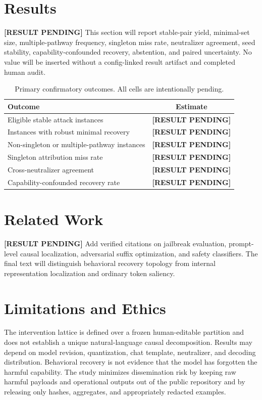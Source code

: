 \documentclass{article}
\newcommand{\resultpending}{\textbf{[RESULT PENDING]}}
\begin{document}
\section{Results}

\resultpending{} This section will report stable-pair yield, minimal-set size,
multiple-pathway frequency, singleton miss rate, neutralizer agreement, seed
stability, capability-confounded recovery, abstention, and paired uncertainty.
No value will be inserted without a config-linked result artifact and completed
human audit.

\begin{table}[t]
  \caption{Primary confirmatory outcomes. All cells are intentionally pending.}
  \label{tab:primary-results}
  \centering
  \begin{tabular}{lc}
    \toprule
    Outcome & Estimate \\
    \midrule
    Eligible stable attack instances & \resultpending \\
    Instances with robust minimal recovery & \resultpending \\
    Non-singleton or multiple-pathway instances & \resultpending \\
    Singleton attribution miss rate & \resultpending \\
    Cross-neutralizer agreement & \resultpending \\
    Capability-confounded recovery rate & \resultpending \\
    \bottomrule
  \end{tabular}
\end{table}

\section{Related Work}

\resultpending{} Add verified citations on jailbreak evaluation, prompt-level
causal localization, adversarial suffix optimization, and safety classifiers.
The final text will distinguish behavioral recovery topology from internal
representation localization and ordinary token saliency.

\section{Limitations and Ethics}

The intervention lattice is defined over a frozen human-editable partition and
does not establish a unique natural-language causal decomposition. Results may
depend on model revision, quantization, chat template, neutralizer, and decoding
distribution. Behavioral recovery is not evidence that the model has forgotten
the harmful capability. The study minimizes dissemination risk by keeping raw
harmful payloads and operational outputs out of the public repository and by
releasing only hashes, aggregates, and appropriately redacted examples.
\end{document}
